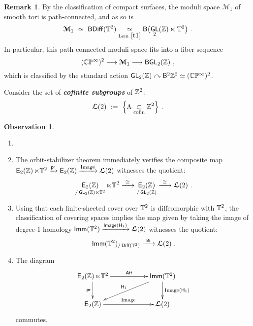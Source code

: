 \documentclass{amsart}
\theoremstyle{definition}
\newtheorem{observation}[theorem]{Observation}
\newtheorem{remark}[theorem]{Remark}
\theoremstyle{remark}
\DeclareMathOperator{\pr}{\mathsf{pr}}
\DeclareMathOperator{\End}{\sf End}
\newcommand{\bit}[1]{\textbf{\textit{#1}}}
\newcommand{\lacts}{\curvearrowright}
\DeclareMathOperator{\Diff}{{\sf Diff}}
\newcommand{\xra}{\xrightarrow}
\def\sE{\mathsf E}\def\sF{\mathsf F}\def\sG{\mathsf G}\def\sH{\mathsf H}
\def\bcM{\boldsymbol{\mathcal M}}\def\bcN{\boldsymbol{\mathcal N}}\def\bcO{\boldsymbol{\mathcal O}}\def\bcP{\boldsymbol{\mathcal P}}\def\bcQ{\boldsymbol{\mathcal Q}}\def\bcR{\boldsymbol{\mathcal R}}
\def\bcM{\boldsymbol{\mathcal M}}
\DeclareMathOperator{\GL}{\sf GL}
\DeclareMathOperator{\Imm}{\sf Imm}
\DeclareMathOperator{\Aff}{\sf Aff}
\DeclareMathOperator{\EZ}{\sE_2(\ZZ)}
\begin{document}
\begin{remark}
\label{r10}
By the classification of compact surfaces, the moduli space $\bcM_1$ of smooth tori is path-connected, and as so is 
\[
\bcM_1
~\simeq~
{\sf BDiff}(\TT^2)
\underset{\rm Lem~\ref{t1}}{~\simeq~}
\sB\bigl(
\GL_2(\ZZ) \ltimes \TT^2
\bigr)
~.
\]
In particular, this path-connected moduli space fits into a fiber sequence
\[
(\CC\PP^\infty)^2
\longrightarrow
\bcM_1
\longrightarrow
{\sf BGL}_2(\ZZ)
~,
\]
which is classified by the standard action $\GL_2(\ZZ) \lacts \sB^2 \ZZ^2 \simeq (\CC\PP^\infty)^2$.

\end{remark}







Consider the set of \bit{cofinite subgroups} of $\mathbb Z^2$:
\begin{equation*}
\boldsymbol{\mathcal L}(2) 
~:=~
\Bigl\{
\Lambda
\underset{\rm cofin}
\subset
\mathbb Z^2
\Bigr\}
~.
\end{equation*}
\begin{observation}
\label{t22}

\begin{enumerate}

\item[~]

\item
The orbit-stabilizer theorem immediately verifies the composite map 
$
\EZ \ltimes \TT^2
\xra{\pr}
\EZ
\xra{\rm Image} 
\bcL(2)
$
witnesses the quotient:
\[
\EZ_{/\GL_2(\ZZ) \ltimes \TT^2 } \ltimes \TT^2
\xra{~\cong~}
\EZ_{/\GL_2(\ZZ)}
\xra{~\cong~}
\bcL(2)
~.
\]


\item
Using that each finite-sheeted cover over $\mathbb T^2$ is diffeomorphic with $\mathbb T^2$, the classification of covering spaces implies the map given by taking the image of degree-1 homology
$
\Imm(\TT^2)
\xra{{\sf Image}(\sH_1)}
\bcL(2)
$
witnesses the quotient:
\[
\Imm(\TT^2)_{/\Diff(\TT^2)}
\xra{~\cong~}
\bcL(2)
~.
\]


\item
The diagram
\[
\xymatrix{
\EZ \ltimes \TT^2
\ar[rr]^-{\Aff}
\ar[d]_-{\pr}
&&
\Imm(\TT^2) 
\ar[d]^-{{\rm Image}(\sH_1)}
\ar[dll]_-{\sH_1}
\\
\EZ
\ar[rr]^-{\rm Image}
&&
\bcL(2)
}
\]
commutes.

\end{enumerate}


\end{observation}
\end{document}
